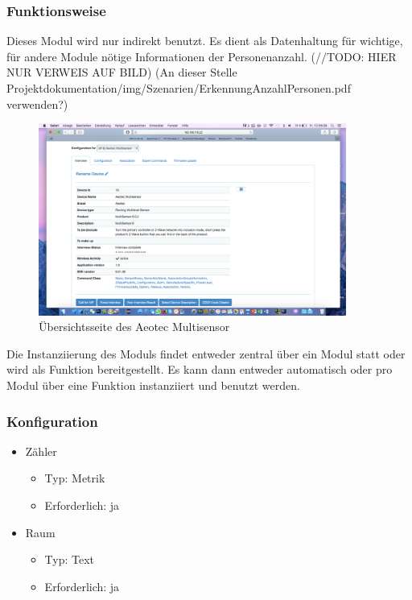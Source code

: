 \subsubsection{Funktionsweise}
Dieses Modul wird nur indirekt benutzt. Es dient als Datenhaltung für wichtige, für andere Module nötige Informationen der Personenanzahl. (//TODO: HIER NUR VERWEIS AUF BILD) (An dieser Stelle Projektdokumentation/img/Szenarien/ErkennungAnzahlPersonen.pdf verwenden?) %

\begin{figure}[h!]
	\centering
	\includegraphics[width=0.9\textwidth]{img/Sensorevaluation/AeoScreenshot.png}
	\caption{Übersichtsseite des Aeotec Multisensor}
	\label{fig:sensorenAeoScreenshot}
\end{figure}


Die Instanziierung des Moduls findet entweder zentral über ein Modul statt oder wird als Funktion bereitgestellt. Es kann dann entweder automatisch oder pro Modul über eine Funktion instanziiert und benutzt werden.

\subsubsection{Konfiguration}
\begin{itemize}
	\item Zähler
	\begin{itemize}
		\item Typ: Metrik
		\item Erforderlich: ja
	\end{itemize}
	\item Raum
	\begin{itemize}
		\item Typ: Text
		\item Erforderlich: ja
	\end{itemize}
\end{itemize}

